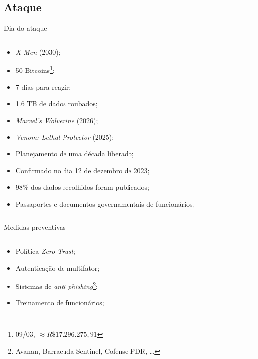 \documentclass[bookmarks=false,aspectratio=169,9pt]{beamer}
\begin{document}
\subsection{Ataque}
\begin{frame}{Dia do ataque}
	\begin{columns}
		\begin{column}{0.5\textwidth}
			\begin{itemize}
				\item \textit{X-Men} (2030)\cite{ign_insomniac};
				\item 50 Bitcoins\footnote{09/03, $\approx R\$17.296.275,91$};
				\item 7 dias para reagir;
				\item 1.6 TB de dados roubados\cite{engadget_insomniac};
				\item \textit{Marvel’s Wolverine} (2026);
				\item \textit{Venom: Lethal Protector} (2025)\cite{};
				\item Planejamento de uma década liberado;
				\item Confirmado no dia 12 de dezembro de 2023;
				\item 98\% dos dados recolhidos foram publicados;
				\item Passaportes e documentos governamentais de funcionários\cite{polygon_insomniac};
			\end{itemize}
		\end{column}
	\end{columns}
\end{frame}
\begin{frame}{Medidas preventivas}
	\begin{columns}
		\begin{column}{0.5\textwidth}
			\begin{itemize}
				\item Política \textit{Zero-Trust};
				\item Autenticação de multifator;
				\item Sistemas de \textit{anti-phishing}\cite{csoonline_antiphishing}\footnote{Avanan, Barracuda Sentinel, Cofense PDR, \dots};
				\item Treinamento de funcionários;
			\end{itemize}
		\end{column}
	\end{columns}
\end{frame}
\end{document}

